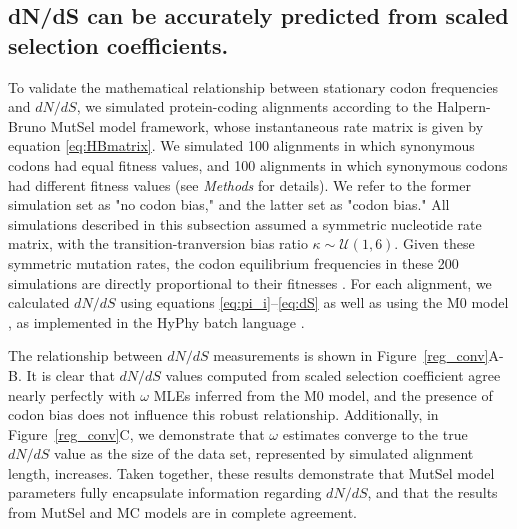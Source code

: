 \documentclass{pnastwo}
\begin{document}
\begin{article}
\subsection*{dN/dS can be accurately predicted from scaled selection coefficients.}

To validate the mathematical relationship between stationary codon frequencies and $dN/dS$, we simulated protein-coding alignments according to the Halpern-Bruno \cite{HalpernBruno1998} MutSel model framework, whose instantaneous rate matrix is given by equation \eqref{eq:HBmatrix}. We simulated 100 alignments in which synonymous codons had equal fitness values, and 100 alignments in which synonymous codons had different fitness values (see \textit{Methods} for details). We refer to the former simulation set as "no codon bias," and the latter set as "codon bias." All simulations described in this subsection assumed  a symmetric nucleotide rate matrix, with the transition-tranversion bias ratio $\kappa \sim \mathcal{U}(1,6)$. Given these symmetric mutation rates, the codon equilibrium frequencies in these 200 simulations are directly proportional to their fitnesses \cite{SellaHirsh2005}. For each alignment, we calculated $dN/dS$ using equations \eqref{eq:pi_i}--\eqref{eq:dS} as well as using the M0 model \cite{NielsenYang1998}, as implemented in the HyPhy batch language \cite{KosakovskyPondetal2005}.

The relationship between $dN/dS$ measurements is shown in Figure~\ref{reg_conv}A-B. It is clear that $dN/dS$ values computed from scaled selection coefficient agree nearly perfectly with $\omega$ MLEs inferred from the M0 model, and the presence of codon bias does not influence this robust relationship. Additionally, in Figure~\ref{reg_conv}C, we demonstrate that $\omega$ estimates converge to the true $dN/dS$ value as the size of the data set, represented by simulated alignment length, increases. Taken together, these results demonstrate that MutSel model parameters fully encapsulate information regarding $dN/dS$, and that the results from MutSel and MC models are in complete agreement.


\end{article}
\end{document}
